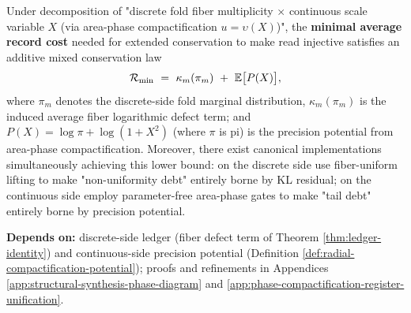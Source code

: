 \begin{theorem}\label{thm:mixed-ledger-mincost}
Under decomposition of "discrete fold fiber multiplicity $\times$ continuous scale variable $X$ (via area-phase compactification $u=\upsilon(X)$)", the \textnormal{\textbf{minimal average record cost}} needed for extended conservation to make read injective satisfies an additive mixed conservation law
$$
\mathcal{R}_{\min}\ =\ \kappa_m(\pi_m)\ +\ \EE\bigl[P(X)\bigr],
$$
where $\pi_m$ denotes the discrete-side fold marginal distribution, $\kappa_m(\pi_m)$ is the induced average fiber logarithmic defect term; and $P(X)=\log\pi+\log(1+X^2)$ (where $\pi$ is pi) is the precision potential from area-phase compactification. Moreover, there exist canonical implementations simultaneously achieving this lower bound: on the discrete side use fiber-uniform lifting to make "non-uniformity debt" entirely borne by KL residual; on the continuous side employ parameter-free area-phase gates to make "tail debt" entirely borne by precision potential.\par
\noindent\textnormal{\textbf{Depends on:} discrete-side ledger (fiber defect term of Theorem \ref{thm:ledger-identity}) and continuous-side precision potential (Definition \ref{def:radial-compactification-potential}); proofs and refinements in Appendices \ref{app:structural-synthesis-phase-diagram} and \ref{app:phase-compactification-register-unification}.}\par
\end{theorem}
